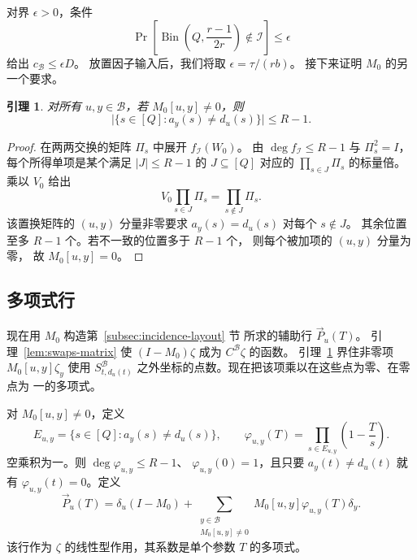 \documentclass[11pt,reqno]{amsart}
\numberwithin{equation}{section}
\newtheorem{lemma}[theorem]{引理}
\theoremstyle{definition}\newtheorem{definition}[theorem]{定义}
\theoremstyle{remark}\newtheorem{remark}[theorem]{注}
\renewcommand{\le}{\leqslant}
\begin{document}
对界 $\epsilon>0$，条件
\begin{equation}\label{eq:incidence-tail}
 \Pr\!\left[\operatorname{Bin}\!\left(Q,\frac{r-1}{2r}\right)
                         \notin\mathcal I\right]\le\epsilon
\end{equation}
给出 $c_{\mathcal B}\le\epsilon D$。
放置因子输入后，我们将取 $\epsilon=\tau/(rb)$。
接下来证明 $M_0$ 的另一个要求。

\begin{lemma}\label{lem:swaps-support}
对所有 $u,y\in\mathcal B$，若 $M_0[u,y]\ne0$，则
\[
 \bigl|\{s\in[Q]:a_y(s)\ne d_u(s)\}\bigr|\le R-1.
\]
\end{lemma}
\begin{proof}
在两两交换的矩阵 $\Pi_s$ 中展开 $f_{\mathcal I}(W_0)$。
由 $\deg f_{\mathcal I}\le R-1$ 与 $\Pi_s^2=I$，
每个所得单项是某个满足 $|J|\le R-1$ 的
$J\subseteq[Q]$ 对应的 $\prod_{s\in J}\Pi_s$
的标量倍。乘以 $V_0$ 给出
\[
 V_0\prod_{s\in J}\Pi_s=\prod_{s\notin J}\Pi_s.
\]
该置换矩阵的 $(u,y)$ 分量非零要求
$a_y(s)=d_u(s)$ 对每个 $s\notin J$。
其余位置至多 $R-1$ 个。若不一致的位置多于 $R-1$ 个，
则每个被加项的 $(u,y)$ 分量为零，
故 $M_0[u,y]=0$。
\end{proof}

\subsection{多项式行}
现在用 $M_0$ 构造第~\ref{subsec:incidence-layout} 节
所求的辅助行 $\vec{P}_u(T)$。
引理~\ref{lem:swaps-matrix} 使 $(I-M_0)\zeta$
成为 $C^{\mathcal B}\zeta$ 的函数。
引理~\ref{lem:swaps-support} 界住非零项
$M_0[u,y]\zeta_y$ 使用 $S^{\mathcal B}_{t,d_u(t)}$
之外坐标的点数。现在把该项乘以在这些点为零、在零点为
一的多项式。

对 $M_0[u,y]\ne0$，定义
\begin{equation}\label{eq:coefficient-correction}
 E_{u,y}=\{s\in[Q]:a_y(s)\ne d_u(s)\},\qquad
 \varphi_{u,y}(T)=\prod_{s\in E_{u,y}}\left(1-\frac Ts\right).
\end{equation}
空乘积为一。则 $\deg\varphi_{u,y}\le R-1$、
$\varphi_{u,y}(0)=1$，且只要 $a_y(t)\ne d_u(t)$ 就有
$\varphi_{u,y}(t)=0$。定义
\begin{equation}\label{eq:swaps-row}
 \vec{P}_u(T)=\delta_u(I-M_0)+
 \sum_{\substack{y\in\mathcal B\\M_0[u,y]\ne0}}
 M_0[u,y]\varphi_{u,y}(T)\delta_y.
\end{equation}
该行作为 $\zeta$ 的线性型作用，其系数是单个参数 $T$
的多项式。
\end{document}
